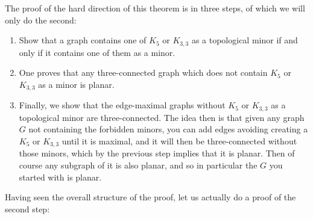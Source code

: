 \documentclass[nobib]{tufte-handout}
\begin{document}
The proof of the hard direction of this theorem is in three steps, of which we will only do the second:
\begin{enumerate}
  \item Show that a graph contains one of $K_{5}$ or $K_{3,3}$ as a topological minor if and only if it contains one of them as a minor.
  \item One proves that any three-connected graph which does not contain $K_5$ or $K_{3,3}$ as a minor is planar.
  \item Finally, we show that the edge-maximal graphs without $K_5$ or $K_{3,3}$ as a topological minor are three-connected. The idea then is that given any graph $G$ not containing the forbidden minors, you can add edges avoiding creating a $K_5$ or $K_{3,3}$ until it is maximal, and it will then be three-connected without those minors, which by the previous step implies that it is planar. Then of course any subgraph of it is also planar, and so in particular the $G$ you started with is planar.
\end{enumerate}

Having seen the overall structure of the proof, let us actually do a proof of the second step:
\end{document}
